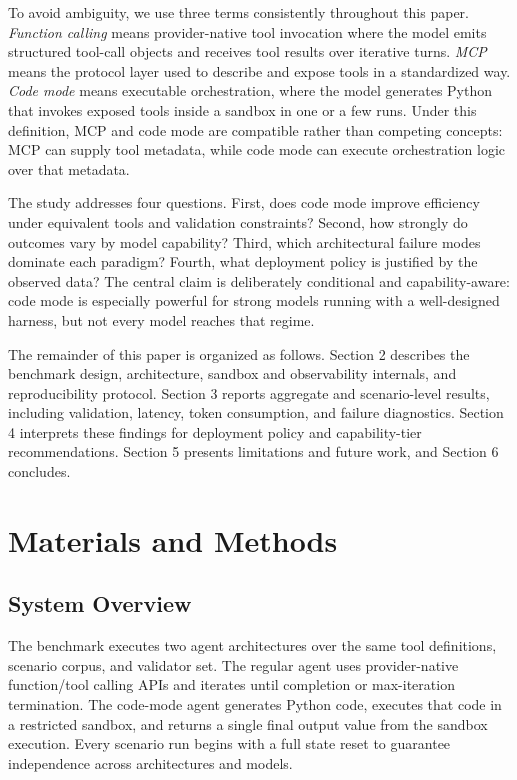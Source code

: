 \documentclass[journal,article,submit,pdftex,moreauthors]{Definitions/mdpi}
\begin{document}
To avoid ambiguity, we use three terms consistently throughout this paper. \emph{Function calling} means provider-native tool invocation where the model emits structured tool-call objects and receives tool results over iterative turns. \emph{MCP} means the protocol layer used to describe and expose tools in a standardized way. \emph{Code mode} means executable orchestration, where the model generates Python that invokes exposed tools inside a sandbox in one or a few runs. Under this definition, MCP and code mode are compatible rather than competing concepts: MCP can supply tool metadata, while code mode can execute orchestration logic over that metadata.

The study addresses four questions. First, does code mode improve efficiency under equivalent tools and validation constraints? Second, how strongly do outcomes vary by model capability? Third, which architectural failure modes dominate each paradigm? Fourth, what deployment policy is justified by the observed data? The central claim is deliberately conditional and capability-aware: code mode is especially powerful for strong models running with a well-designed harness, but not every model reaches that regime.

The remainder of this paper is organized as follows. Section 2 describes the benchmark design, architecture, sandbox and observability internals, and reproducibility protocol. Section 3 reports aggregate and scenario-level results, including validation, latency, token consumption, and failure diagnostics. Section 4 interprets these findings for deployment policy and capability-tier recommendations. Section 5 presents limitations and future work, and Section 6 concludes.

\section{Materials and Methods}

\subsection{System Overview}

The benchmark executes two agent architectures over the same tool definitions, scenario corpus, and validator set. The regular agent uses provider-native function/tool calling APIs \cite{ref-openai-fc} and iterates until completion or max-iteration termination. The code-mode agent generates Python code, executes that code in a restricted sandbox, and returns a single final output value from the sandbox execution. Every scenario run begins with a full state reset to guarantee independence across architectures and models.
\end{document}

